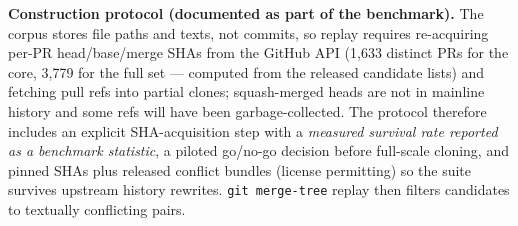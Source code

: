 \documentclass{article}
\begin{document}
\textbf{Construction protocol (documented as part of the benchmark).} The corpus stores file paths and texts, not commits, so replay requires re-acquiring per-PR head/base/merge SHAs from the GitHub API (1{,}633 distinct PRs for the core, 3{,}779 for the full set --- computed from the released candidate lists) and fetching pull refs into partial clones; squash-merged heads are not in mainline history and some refs will have been garbage-collected. The protocol therefore includes an explicit SHA-acquisition step with a \emph{measured survival rate reported as a benchmark statistic}, a piloted go/no-go decision before full-scale cloning, and pinned SHAs plus released conflict bundles (license permitting) so the suite survives upstream history rewrites. \texttt{git merge-tree} replay then filters candidates to textually conflicting pairs.
\end{document}

